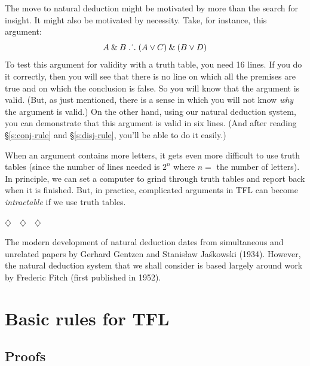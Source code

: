 The move to natural deduction might be motivated by more than the search for insight. It might also be motivated by necessity. Take, for instance, this argument:
$$A \mathbin{\&} B \mathrel{\ldotp\dot{}\,\ldotp} (A \vee C) \mathbin{\&} (B \vee D)$$
To test this argument for validity with a truth table, you need 16 lines. If you do it correctly, then you will see that there is no line on which all the premises are true and on which the conclusion is false. So you will know that the argument is valid. (But, as just mentioned, there is a sense in which you will not know \emph{why} the argument is valid.) On the other hand, using our natural deduction system, you can demonstrate that this argument is valid in six lines. (And after reading \S\ref{s:conj-rule} and \S\ref{s:disj-rule}, you'll be able to do it easily.) 

When an argument contains more letters, it gets even more difficult to use truth tables (since the number of lines needed is $2^{n}$ where $n=$ the number of letters). In principle, we can set a computer to grind through truth tables and report back when it is finished. But, in practice, complicated arguments in TFL can become \emph{intractable} if we use truth tables. %

\begin{center}
	$\diamondsuit\quad\diamondsuit\quad\diamondsuit$
\end{center}

\noindent The modern development of natural deduction dates from simultaneous and unrelated papers by Gerhard Gentzen and Stanisław Jaśkowski (1934). However, the natural deduction system that we shall consider is based largely around work by Frederic Fitch (first published in 1952).



\chapter{Basic rules for TFL}\label{s:BasicTFL}

\section{Proofs}

